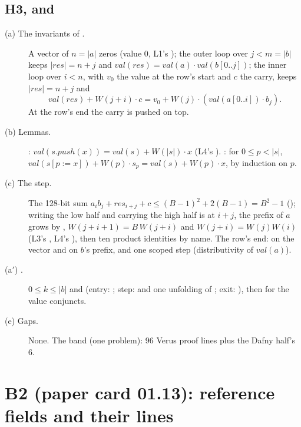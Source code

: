 \documentclass[11pt]{article}
\begin{document}
\subsection*{H3,  and }
\begin{description}
\item[(a) The invariants of .] A vector of $n = |a|$ zeros
  (value 0, L1's ); the outer loop over
  $j < m = |b|$ keeps $|res| = n + j$ and $\mathit{val}(res) =
  \mathit{val}(a)\cdot\mathit{val}(b[0..j])$; the inner loop over $i < n$,
  with $v_0$ the value at the row's start and $c$ the carry, keeps $|res| = n
  + j$ and
  \[ \mathit{val}(res) + W(j+i)\cdot c = v_0 + W(j)\cdot(\mathit{val}(a[0..i])
     \cdot b_j). \]
  At the row's end the carry is pushed on top.
\item[(b) Lemmas.] : $\mathit{val}(s.push(x)) =
  \mathit{val}(s) + W(|s|)\cdot x$ (L4's ).
  : for $0 \le p < |s|$,
  $\mathit{val}(s[p := x]) + W(p)\cdot s_p = \mathit{val}(s) + W(p)\cdot x$,
  by induction on $p$.
\item[(c) The step.] The 128-bit sum $a_i b_j + res_{i+j} + c \le (B-1)^2 +
  2(B-1) = B^2 - 1$ (); writing the low half and
  carrying the high half is  at $i + j$, the prefix of $a$
  grows by , $W(j+i+1) = B\,W(j+i)$ and $W(j+i) =
  W(j)W(i)$ (L3's , L4's ),
  then ten product identities by name. The row's end: 
  on the vector and on $b$'s prefix, and one scoped 
  step (distributivity of $\mathit{val}(a)$).
\item[(a$'$) .] $0 \le k \le |b|$ and
   (entry: ;
  step:  and one unfolding of ;
  exit: ), then  for
  the value conjuncts.
\item[(e) Gaps.] None. The band (one problem): 96 Verus proof lines plus
  the Dafny half's 6.
\end{description}

\section*{B2 (paper card 01.13): reference fields and their lines}
\end{document}
